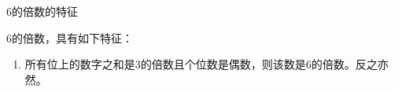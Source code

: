 \documentclass[aspectratio=169]{ctexbeamer} %
\date{\today}
\begin{document}
\begin{frame}[t]{6的倍数的特征}
\begin{spacing}{1.2}
\normalsize
6的倍数，具有如下特征：
\begin{enumerate}[label={\arabic*.}]
\item 所有位上的数字之和是3的倍数且个位数是偶数，则该数是6的倍数。反之亦然。
\end{enumerate}

\end{spacing}
\end{frame}
\end{document}
